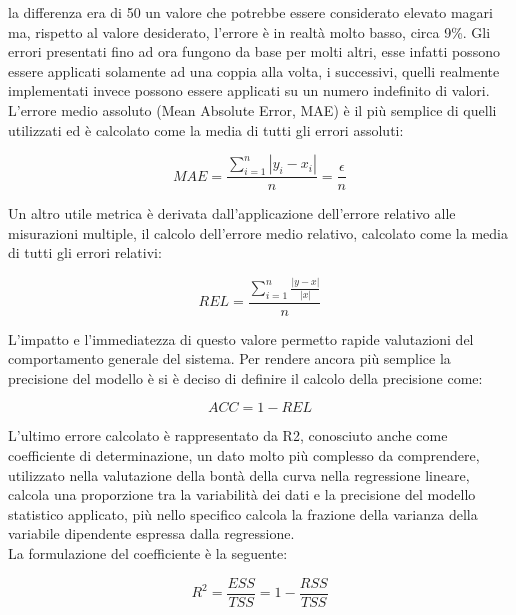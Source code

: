 \documentclass[%
    corpo=12pt,
    twoside,
    oldstyle,
    autoretitolo,
    greek,
    evenboxes,
]{toptesi}
\begin{document}
la differenza era di 50 un valore che potrebbe essere considerato elevato magari ma, rispetto al valore desiderato, l'errore è in realtà molto basso, circa 9\%. Gli errori presentati fino ad ora fungono da base per molti altri, esse infatti possono essere applicati solamente ad una coppia alla volta, i successivi, quelli realmente implementati invece possono essere applicati su un numero indefinito di valori.\\
L'errore medio assoluto (Mean Absolute Error, MAE) è il più semplice di quelli utilizzati ed è calcolato come la media di tutti gli errori assoluti:
\begin{center}
  \begin{equation}
    MAE = \frac{\sum_{i=1}^{n}{|y_{i} - x_{i}|}}{n} = \frac{\epsilon}{n}
  \end{equation}
\end{center}
Un altro utile metrica è derivata dall'applicazione dell'errore relativo alle misurazioni multiple, il calcolo dell'errore medio relativo, calcolato come la media di tutti gli errori relativi:
\begin{center}
  \begin{equation}
    REL = \frac{\sum_{i=1}^{n}{\frac{|y - x|}{|x|}}}{n}
  \end{equation}
\end{center}
L'impatto e l'immediatezza di questo valore permetto rapide valutazioni del comportamento generale del sistema. Per rendere ancora più semplice la precisione del modello è si è deciso di definire il calcolo della precisione come:
\begin{center}
  \begin{equation}
    ACC = 1 - REL
  \end{equation}
\end{center}
L'ultimo errore calcolato è rappresentato da R2, conosciuto anche come coefficiente di determinazione, un dato molto più complesso da comprendere, utilizzato nella valutazione della bontà della curva nella regressione lineare, calcola una proporzione tra la variabilità dei dati e la precisione del modello statistico applicato, più nello specifico calcola la frazione della varianza della variabile dipendente espressa dalla regressione.\\
La formulazione del coefficiente è la seguente:
\begin{center}
  \begin{equation}
    R^2 = \frac{ESS}{TSS} = 1 - \frac{RSS}{TSS}
  \end{equation}
\end{center}
\end{document}
